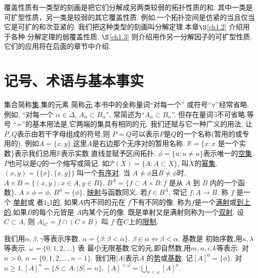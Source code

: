 \documentclass[main.tex]{subfiles}
\begin{document}
	
覆盖性质有一类型的刻画是把它们分解成另两类较弱的拓扑性质的和.
其中一类是可扩型性质，另一类是较弱的其它覆盖性质.
例如,一个拓扑空间是仿紧的当且仅当它是可扩的和次亚紧的.
我们把这种类型的刻画叫分解定理.本章$\S$\ref{ch1.2} 介绍用于各种
分解定理的弱覆盖性质. $\S$\ref{ch1.3} 则介绍用作另一分解因子的可扩型性质.
它们的应用将在后面的章节中介绍.
	
\section{记号、术语与基本事实}\label{ch1.1}
集合简称\underline{集},集的元素
简称\underline{元}.本书中的全称量词“对每一个”
或符号“$\forall$”经常省略.例如, “对每一个
$\alpha\in\Delta$, $A_\alpha \subset B_\alpha$”,
常简述为“$A_\alpha \subset B_\alpha$”.
但存在量词$\exists$不可省略.等号
“=”的基本用法是,它两端的集具有相同的元.
我们还赋与它一种广义的用法, 让$P, Q$表示由若干字母组成的符号,则
$P=Q$可以表示$P$是$Q$的一个名称(暂用的或专用的).
例如$A=\{x,y\}$,这里$A$是右边那个无序对的暂用名称.
$\mathbb{R} = \{x: x$ 是一个实数\}表示我们总用$\mathbb{R}$表示实数
直线並赋予区间拓扑.
$\phi=\{u: u\ne u\}$表示唯一的\underline{空集}.
$P$也可以是$Q$的一个缩写或简记. 如$\mathscr{P}(X)=\{A:A\subset X\}$, 
叫$X$的\underline{幂集}.
$(x, y) = \{ \{x\}, \{x, y\}\}$ 叫一个\underline{有序对}. 
当 $A\ne \phi$且$B\ne \phi$时, $A\times B = \{(x, y): x\in A, y\in B\}$.
$B^A = \{f\subset A\times B: f$ 是从 $A$ 到 $B$ 内的一个函数\}.
$A\times \phi = \phi$. $B^\phi = \{\phi\}$.
\underline{映射}与函数同义.  若$f\in B^A$, 常记 $f: A\to B$. 称 $f$ 是一个
\underline{单射}或
者\underline{$1$-$1$的}, 如果$A$内不同的元在  $f$下有不同的像.
称为$f$是一个\underline{满射}或\underline{到上的},如果$B$的每个元皆是
$A$内某个元的像. 既是单射又是满射则称为一个\underline{双射}.
设$C\subset A$, 则 $A\vert{}_C = f\cap (C\times B)$ 叫 $f$
在$C$上的\underline{限制}.

我们用$\alpha, \beta, \gamma$等表示序数. $\alpha = \{\beta: \beta < \alpha\}$. $\beta \in \alpha \Leftrightarrow\beta<\alpha$. 基数是
初始序数,用$\kappa,\lambda$ 等表示. $\omega = \{0, 1, 2, \dots\}$ 表
最小无限基数.它的元,即自然数,用$m, n, i , k$等表示.
对$n>0, \, n = \{0,1,2, \dots, n-1\}$. 我们用$|A|$表示$A$ 
的\underline{势}或\underline{基数}.
记$[A]^0=\{\phi\}$. 对$n\ge1, [A]^n = \{S\subset A: |S| = n\}$.
$[A]^{<\omega} = \bigcup_{n<\omega}[A]^n$.
\end{document}
